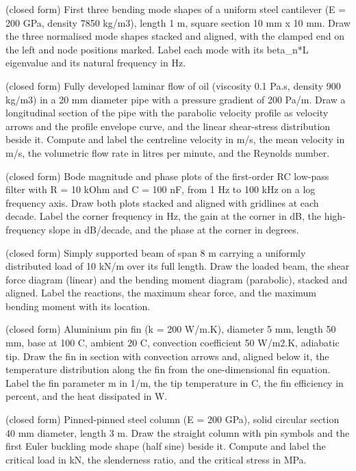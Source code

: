 \documentclass[11pt,a4paper]{article}
\begin{document}
\begin{description}[style=nextline,leftmargin=1em]
\item[\texttt{cantilever\_mode\_shapes}] (closed form) First three bending mode shapes of a uniform steel cantilever (E = 200 GPa, density 7850 kg/m3), length 1 m, square section 10 mm x 10 mm. Draw the three normalised mode shapes stacked and aligned, with the clamped end on the left and node positions marked. Label each mode with its beta\_n*L eigenvalue and its natural frequency in Hz.
\item[\texttt{poiseuille\_profile}] (closed form) Fully developed laminar flow of oil (viscosity 0.1 Pa.s, density 900 kg/m3) in a 20 mm diameter pipe with a pressure gradient of 200 Pa/m. Draw a longitudinal section of the pipe with the parabolic velocity profile as velocity arrows and the profile envelope curve, and the linear shear-stress distribution beside it. Compute and label the centreline velocity in m/s, the mean velocity in m/s, the volumetric flow rate in litres per minute, and the Reynolds number.
\item[\texttt{rc\_bode\_plot}] (closed form) Bode magnitude and phase plots of the first-order RC low-pass filter with R = 10 kOhm and C = 100 nF, from 1 Hz to 100 kHz on a log frequency axis. Draw both plots stacked and aligned with gridlines at each decade. Label the corner frequency in Hz, the gain at the corner in dB, the high-frequency slope in dB/decade, and the phase at the corner in degrees.
\item[\texttt{udl\_beam\_shear\_moment}] (closed form) Simply supported beam of span 8 m carrying a uniformly distributed load of 10 kN/m over its full length. Draw the loaded beam, the shear force diagram (linear) and the bending moment diagram (parabolic), stacked and aligned. Label the reactions, the maximum shear force, and the maximum bending moment with its location.
\item[\texttt{pin\_fin\_temperature}] (closed form) Aluminium pin fin (k = 200 W/m.K), diameter 5 mm, length 50 mm, base at 100 C, ambient 20 C, convection coefficient 50 W/m2.K, adiabatic tip. Draw the fin in section with convection arrows and, aligned below it, the temperature distribution along the fin from the one-dimensional fin equation. Label the fin parameter m in 1/m, the tip temperature in C, the fin efficiency in percent, and the heat dissipated in W.
\item[\texttt{euler\_buckling}] (closed form) Pinned-pinned steel column (E = 200 GPa), solid circular section 40 mm diameter, length 3 m. Draw the straight column with pin symbols and the first Euler buckling mode shape (half sine) beside it. Compute and label the critical load in kN, the slenderness ratio, and the critical stress in MPa.

\end{description}
\end{document}
